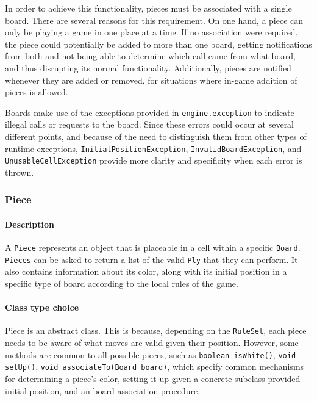 												In order to achieve this functionality, pieces must be associated with a single board. There
												are several reasons for this requirement. On one hand, a piece can only be playing a game
												in one place at a time. If no association were required, the piece could potentially be
												added to more than one board, getting notifications from both and not being able to determine
												which call came from what board, and thus disrupting its normal functionality. Additionally, pieces 
												are notified whenever they are added or removed, for situations where in-game addition of
												pieces is allowed.  	
												
												Boards make use of the exceptions provided in \texttt{engine.exception} to indicate 
												illegal calls or requests to the board. Since these errors could occur at several
												different points, and because of the need to distinguish them from other types of 
												runtime exceptions, \texttt{InitialPositionException}, \texttt{InvalidBoardException}, 
												and \texttt{UnusableCellException} provide more clarity and specificity when 
												each error is thrown. 											
																								
	 		 \subsubsection{Piece} 
	 		 		\paragraph{Description}A \texttt{Piece} represents an object that is placeable in a cell 
	 		 									within a specific \texttt{Board}. \texttt{Pieces} can be asked to
	 		 									return a list of the valid \texttt{Ply} that they can perform. It
	 		 									also contains information about its color, 
	 		 									along with its initial position in a 
	 		 									specific type of board according to the local rules of the game. 
	 		 						
	 		 		\paragraph{Class type choice}	Piece is an abstract class. This is because, depending on the 
	 		 									\texttt{RuleSet}, each piece needs to be aware of what moves 
	 		 									are valid given their position. However, some methods are common
	 		 									to all possible pieces, such as \texttt{boolean isWhite()}, 
	 		 									\texttt{void setUp()}, \texttt{void associateTo(Board board)},
	 		 									which specify common mechanisms for determining a piece's color,
	 		 									setting it up given a concrete subclass-provided initial position, 
	 		 									and an board association procedure. 
	 		
